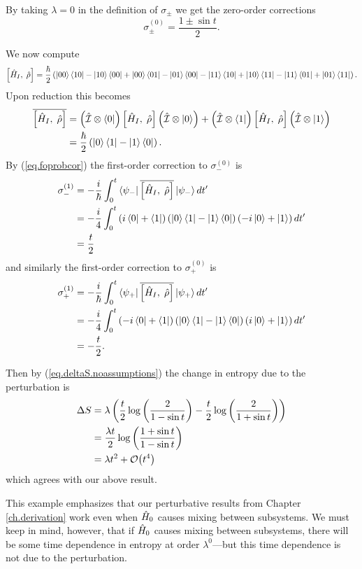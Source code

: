 By taking \(\lambda=0\) in the definition of \(\sigma_\pm\) we get the zero-order corrections
\[
\sigma_\pm^{(0)} = \frac{1\pm \sin t}{2}.
\]

We now compute
\[
\left[\hat{H}_I, \;\hat{\rho}\right] = \frac{\hbar}{2} \left(\left|00\right\rangle\left\langle10\right|- \left|10\right\rangle\left\langle00\right| + \left|00\right\rangle\left\langle01\right| - \left|01\right\rangle\left\langle00\right| - \left|11\right\rangle\left\langle10\right| + \left|10\right\rangle\left\langle11\right| - \left|11\right\rangle\left\langle01\right| +\left|01\right\rangle\left\langle11\right|\right).
\]
Upon reduction this becomes
\begin{align*}
\overline{\left[\hat{H}_I, \;\hat{\rho}\right]} &= \left(\hat{\mathcal{I}}\otimes\left\langle0\right| \right)\left[\hat{H}_I, \;\hat{\rho}\right] \left(\hat{\mathcal{I}}\otimes\left|0\right\rangle\right) + \left(\hat{\mathcal{I}}\otimes\left\langle1\right|\right) \left[\hat{H}_I, \;\hat{\rho}\right] \left(\hat{\mathcal{I}}\otimes\left|1\right\rangle\right) \\
&= \frac{\hbar}{2}\left(\left|0\right\rangle\left\langle1\right| - \left|1\right\rangle\left\langle0\right|\right).
\end{align*}
By (\ref{eq.foprobcor}) the first-order correction to \(\sigma_-^{(0)}\) is
\begin{align*}
\sigma_-^{(1)} &= -\frac{i}{\hbar} \int_{0}^t \left\langle\psi_-\right| \overline{\left[\hat{H}_I, \;\hat{\rho}\right]} \left|\psi_-\right\rangle dt^\prime \\
&= -\frac{i}{4} \int_{0}^t \left(i\left\langle0\right| + \left\langle1\right|\right) \left(\left|0\right\rangle\left\langle1\right| - \left|1\right\rangle\left\langle0\right|\right) \left(-i\left|0\right\rangle + \left|1\right\rangle\right) dt^\prime \\
&= \frac{t}{2}
\end{align*}
and similarly the first-order correction to \(\sigma_+^{(0)}\) is
\begin{align*}
\sigma_+^{(1)} &= -\frac{i}{\hbar} \int_{0}^t \left\langle\psi_+\right| \overline{\left[\hat{H}_I, \;\hat{\rho}\right]} \left|\psi_+\right\rangle dt^\prime \\
&= -\frac{i}{4} \int_{0}^t \left(-i\left\langle0\right| + \left\langle1\right|\right) \left(\left|0\right\rangle\left\langle1\right| - \left|1\right\rangle\left\langle0\right|\right) \left(i\left|0\right\rangle + \left|1\right\rangle\right) dt^\prime \\
&= -\frac{t}{2}.
\end{align*}

Then by (\ref{eq.deltaS.noassumptions}) the change in entropy due to the perturbation is
\begin{align*}
\Delta S &= \lambda \left(\frac{t}{2} \log \left(\frac{2}{1 - \sin t}\right) - \frac{t}{2}\log\left(\frac{2}{1+\sin t}\right)\right) \\
&= \frac{\lambda t}{2} \log \left(\frac{1+ \sin t}{1 - \sin t}\right) \\
&= \lambda t^2 + \mathcal{O}{\left(t^4\right)}
\end{align*}
which agrees with our above result.

This example emphasizes that our perturbative results from Chapter \ref{ch.derivation} work even when \(\hat{H}_0\) causes mixing between subsystems. We must keep in mind, however, that if \(\hat{H}_0\) causes mixing between subsystems, there will be some time dependence in entropy at order \(\lambda^0\)---but this time dependence is not due to the perturbation.

